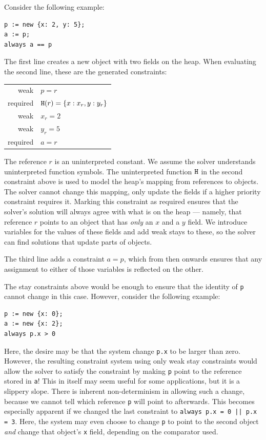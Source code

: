 Consider the following example:
\begin{lstlisting}
p := new {x: 2, y: 5};
a := p;
always a == p
\end{lstlisting}
The first line creates a new object with two fields on the heap. When
evaluating the second line, these are the generated constraints:
\begin{center}
\begin{tabular}{rl}
  weak & $p = r$ \\
  required & $\texttt{\upshape H}(r) = \{x: x_r, y: y_r\}$\\
  weak & $x_r = 2$\\
  weak & $y_r = 5$\\
  required & $a = r$
\end{tabular}
\end{center}
The reference $r$ is an uninterpreted constant. We assume the solver
understands uninterpreted function symbols. The uninterpreted function
$\texttt{\upshape H}$ in the second constraint above is used to model the heap's
mapping from references to objects. The solver cannot change this
mapping, only update the fields if a higher priority constraint
requires it. Marking this constraint as required ensures that the
solver's solution will always agree with what is on the heap ---
namely, that reference $r$ points to an object that has \emph{only} an
$x$ and a $y$ field. We introduce variables for the values of these
fields and add weak stays to these, so the solver can find solutions
that update parts of objects.

The third line adds a constraint $a=p$, which from then onwards
ensures that any assignment to either of those variables is reflected
on the other.

The stay constraints above would be enough to ensure that the identity
of \verb!p! cannot change in this case. However, consider the
following example:
\begin{lstlisting}
p := new {x: 0};
a := new {x: 2};
always p.x > 0
\end{lstlisting}

Here, the desire may be that the system change \verb!p.x! to be larger
than zero. However, the resulting constraint system using only weak
stay constraints would allow the solver to satisfy the constraint by
making \verb!p! point to the reference stored in \verb!a!! This in
itself may seem useful for some applications, but it is a slippery
slope. There is inherent non-determinism in allowing such a change,
because we cannot tell which reference \verb!p! will point to
afterwards. This becomes especially apparent if we changed the last
constraint to \verb!always p.x = 0 || p.x = 3!. Here, the system may
even choose to change \verb!p! to point to the second object
\emph{and} change that object's \verb!x! field, depending on the
comparator used.

